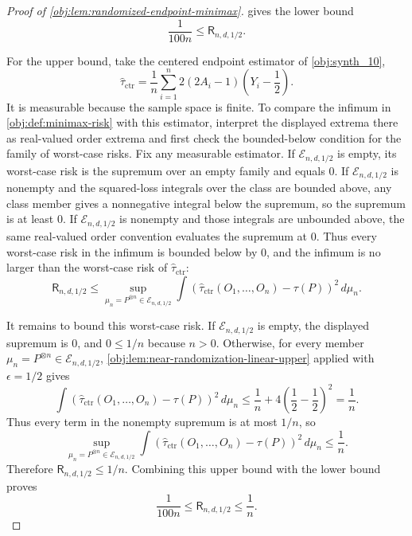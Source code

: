 \documentclass[11pt]{article}
\begin{document}
\begin{proof}[Proof of \cref{obj:lem:randomized-endpoint-minimax}]
 gives the lower bound
\[
\frac1{100n}\le \mathsf R_{n,d,1/2}.
\]

For the upper bound, take the centered endpoint estimator of \cref{obj:synth_10},
\[
\widehat\tau_{\mathrm{ctr}}
=
\frac1n\sum_{i=1}^n
2(2A_i-1)\left(Y_i-\frac12\right).
\]
It is measurable because the sample space is finite. To compare the infimum in \cref{obj:def:minimax-risk} with this estimator, interpret the displayed extrema there as real-valued order extrema and first check the bounded-below condition for the family of worst-case risks. Fix any measurable estimator. If \(\mathcal E_{n,d,1/2}\) is empty, its worst-case risk is the supremum over an empty family and equals \(0\). If \(\mathcal E_{n,d,1/2}\) is nonempty and the squared-loss integrals over the class are bounded above, any class member gives a nonnegative integral below the supremum, so the supremum is at least \(0\). If \(\mathcal E_{n,d,1/2}\) is nonempty and those integrals are unbounded above, the same real-valued order convention evaluates the supremum at \(0\). Thus every worst-case risk in the infimum is bounded below by \(0\), and the infimum is no larger than the worst-case risk of \(\widehat\tau_{\mathrm{ctr}}\):
\[
\mathsf R_{n,d,1/2}
\le
\sup_{\mu_n=P^{\otimes n}\in\mathcal E_{n,d,1/2}}
\int
\left(\widehat\tau_{\mathrm{ctr}}(O_1,\ldots,O_n)-\tau(P)\right)^2
\,d\mu_n .
\]

It remains to bound this worst-case risk. If \(\mathcal E_{n,d,1/2}\) is empty, the displayed supremum is \(0\), and \(0\le 1/n\) because \(n>0\). Otherwise, for every member \(\mu_n=P^{\otimes n}\in\mathcal E_{n,d,1/2}\), \cref{obj:lem:near-randomization-linear-upper} applied with \(\epsilon=1/2\) gives
\[
\int
\left(\widehat\tau_{\mathrm{ctr}}(O_1,\ldots,O_n)-\tau(P)\right)^2
\,d\mu_n
\le
\frac1n+4\left(\frac12-\frac12\right)^2
=
\frac1n .
\]
Thus every term in the nonempty supremum is at most \(1/n\), so
\[
\sup_{\mu_n=P^{\otimes n}\in\mathcal E_{n,d,1/2}}
\int
\left(\widehat\tau_{\mathrm{ctr}}(O_1,\ldots,O_n)-\tau(P)\right)^2
\,d\mu_n
\le \frac1n .
\]
Therefore \(\mathsf R_{n,d,1/2}\le 1/n\). Combining this upper bound with the lower bound proves
\[
\frac1{100n}\le \mathsf R_{n,d,1/2}\le \frac1n .
\]
\end{proof}
\end{document}

